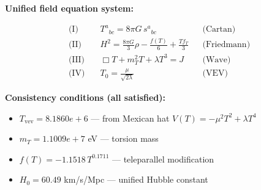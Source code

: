 
\textbf{Unified field equation system:}

\begin{align}
  \text{(I)} \quad & T^a{}_{bc} = 8\pi G \, s^a{}_{bc} && \text{(Cartan)} \\
  \text{(II)} \quad & H^2 = \frac{8\pi G}{3}\rho - \frac{f(T)}{6} + \frac{Tf_T}{3} && \text{(Friedmann)} \\
  \text{(III)} \quad & \Box T + m_T^2 T + \lambda T^3 = J && \text{(Wave)} \\
  \text{(IV)} \quad & T_0 = \frac{\mu}{\sqrt{2\lambda}} && \text{(VEV)}
\end{align}

\textbf{Consistency conditions (all satisfied):}
\begin{itemize}
  \item $T_{\text{vev}} = 8.1860e+6$ — from Mexican hat $V(T) = -\mu^2 T^2 + \lambda T^4$
  \item $m_T = 1.1009e+7$ eV — torsion mass
  \item $f(T) = -1.1518 \, T^{0.1711}$ — teleparallel modification
  \item $H_0 = 60.49$ km/s/Mpc — unified Hubble constant
\end{itemize}